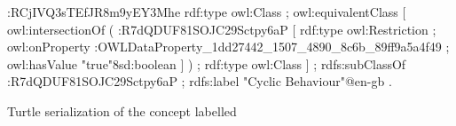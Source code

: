 \begin{listing}
    \begin{mintedXML}
:RCjIVQ3sTEfJR8m9yEY3Mhe rdf:type owl:Class ;
    owl:equivalentClass [ 
        owl:intersectionOf ( 
            :R7dQDUF81SOJC29Sctpy6aP
            [ 
              rdf:type owl:Restriction ;
              owl:onProperty :OWLDataProperty_1dd27442_1507_4890_8c6b_89ff9a5a4f49 ;
              owl:hasValue "true"^^xsd:boolean
            ]
        ) ;
        rdf:type owl:Class
    ] ;
    rdfs:subClassOf :R7dQDUF81SOJC29Sctpy6aP ;
    rdfs:label "Cyclic Behaviour"@en-gb .
    \end{mintedXML}
    \caption{Turtle serialization of the concept labelled }
    \label{lst: turtle serialization cyclic behaviour}
\end{listing}